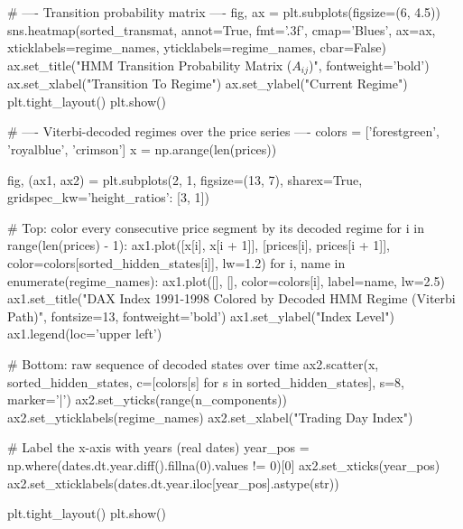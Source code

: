 \begin{codebox}[title={Transition probability matrix}]
# ---- Transition probability matrix ----
fig, ax = plt.subplots(figsize=(6, 4.5))
sns.heatmap(sorted_transmat, annot=True, fmt='.3f', cmap='Blues', ax=ax,
            xticklabels=regime_names, yticklabels=regime_names, cbar=False)
ax.set_title("HMM Transition Probability Matrix ($A_{ij}$)", fontweight='bold')
ax.set_xlabel("Transition To Regime")
ax.set_ylabel("Current Regime")
plt.tight_layout()
plt.show()

# ---- Viterbi-decoded regimes over the price series ----
colors = ['forestgreen', 'royalblue', 'crimson']
x = np.arange(len(prices))

fig, (ax1, ax2) = plt.subplots(2, 1, figsize=(13, 7), sharex=True, gridspec_kw={'height_ratios': [3, 1]})

# Top: color every consecutive price segment by its decoded regime
for i in range(len(prices) - 1):
    ax1.plot([x[i], x[i + 1]], [prices[i], prices[i + 1]], color=colors[sorted_hidden_states[i]], lw=1.2)
for i, name in enumerate(regime_names):
    ax1.plot([], [], color=colors[i], label=name, lw=2.5)
ax1.set_title("DAX Index 1991-1998 Colored by Decoded HMM Regime (Viterbi Path)", fontsize=13, fontweight='bold')
ax1.set_ylabel("Index Level")
ax1.legend(loc='upper left')

# Bottom: raw sequence of decoded states over time
ax2.scatter(x, sorted_hidden_states, c=[colors[s] for s in sorted_hidden_states], s=8, marker='|')
ax2.set_yticks(range(n_components))
ax2.set_yticklabels(regime_names)
ax2.set_xlabel("Trading Day Index")

# Label the x-axis with years (real dates)
year_pos = np.where(dates.dt.year.diff().fillna(0).values != 0)[0]
ax2.set_xticks(year_pos)
ax2.set_xticklabels(dates.dt.year.iloc[year_pos].astype(str))

plt.tight_layout()
plt.show()
\end{codebox}
